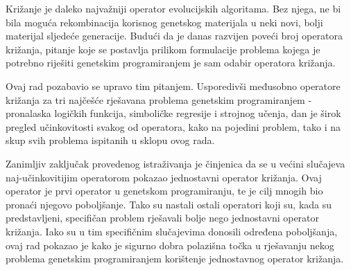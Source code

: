 Križanje je daleko najvažniji operator evolucijskih algoritama. Bez njega, ne bi bila moguća rekombinacija korisnog genetskog materijala u neki novi, bolji materijal sljedeće generacije. Budući da je danas razvijen poveći broj operatora križanja, pitanje koje se postavlja prilikom formulacije problema kojega je potrebno riješiti genetskim programiranjem je sam odabir operatora križanja. 

Ovaj rad pozabavio se upravo tim pitanjem. Usporedivši međusobno operatore križanja za tri najčešće rješavana problema genetskim programiranjem - pronalaska logičkih funkcija, simboličke regresije i strojnog učenja, dan je širok pregled učinkovitosti svakog od operatora, kako na pojedini problem, tako i na skup svih problema ispitanih u sklopu ovog rada. 

Zanimljiv zaključak provedenog istraživanja je činjenica da se u većini slučajeva naj-učinkovitijim operatorom pokazao jednostavni operator križanja. Ovaj operator je prvi operator u genetskom programiranju, te je cilj mnogih bio pronaći njegovo poboljšanje. Tako su nastali ostali operatori koji su, kada su predstavljeni, specifičan problem rješavali bolje nego jednostavni operator križanja. Iako su u tim specifičnim slučajevima donosili određena poboljšanja, ovaj rad pokazao je kako je sigurno dobra polazišna točka u rješavanju nekog problema genetskim programiranjem korištenje jednostavnog operator križanja.